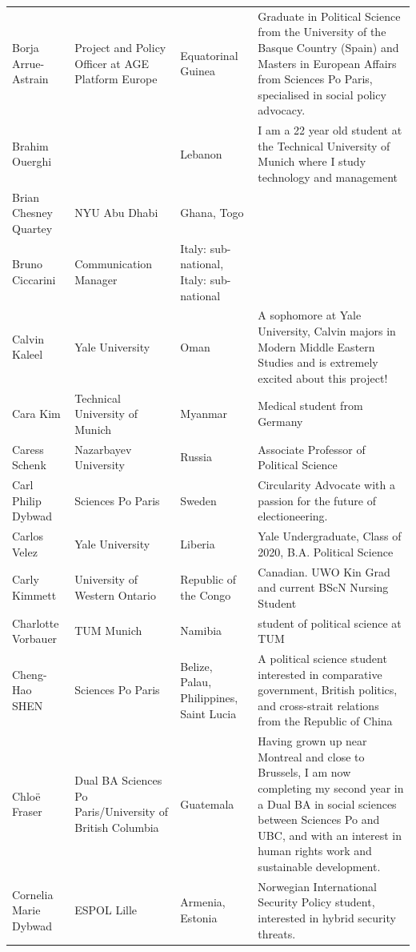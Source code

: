 \documentclass[]{article}
\begin{document}
\begin{longtable}{l>{\raggedright\arraybackslash}p{2cm}>{\raggedright\arraybackslash}p{2cm}>{\raggedright\arraybackslash}p{3cm}}
Borja Arrue-Astrain & Project and Policy Officer at AGE Platform Europe & Equatorinal Guinea & Graduate in Political Science from the University of the Basque Country (Spain) and Masters in European Affairs from Sciences Po Paris, specialised in social policy advocacy.\\
\rowcolor{gray!6}  Brahim Ouerghi &  & Lebanon & I am a 22 year old student at the Technical University of Munich where I study technology and management\\
Brian Chesney Quartey & NYU Abu Dhabi & Ghana, Togo & \\
\addlinespace
\rowcolor{gray!6}  Bruno Ciccarini & Communication Manager & Italy: sub-national, Italy: sub-national & \\
Calvin Kaleel & Yale University & Oman & A sophomore at Yale University, Calvin majors in Modern Middle Eastern Studies and is extremely excited about this project!\\
\rowcolor{gray!6}  Cara Kim & Technical University of Munich & Myanmar & Medical student from Germany\\
Caress Schenk & Nazarbayev University & Russia & Associate Professor of Political Science\\
\rowcolor{gray!6}  Carl Philip Dybwad & Sciences Po Paris & Sweden & Circularity Advocate with a passion for the future of electioneering.\\
\addlinespace
Carlos Velez & Yale University & Liberia & Yale Undergraduate, Class of 2020, B.A. Political Science\\
\rowcolor{gray!6}  Carly Kimmett & University of Western Ontario & Republic of the Congo & Canadian. UWO Kin Grad and current BScN Nursing Student\\
Charlotte Vorbauer & TUM Munich & Namibia & student of political science at TUM\\
\rowcolor{gray!6}  Cheng-Hao SHEN & Sciences Po Paris & Belize, Palau, Philippines, Saint Lucia & A political science student interested in comparative government, British politics, and cross-strait relations from the Republic of China\\
Chloë Fraser & Dual BA Sciences Po Paris/University of British Columbia & Guatemala & Having grown up near Montreal and close to Brussels, I am now completing my second year in a Dual BA in social sciences between Sciences Po and UBC, and with an interest in human rights work and sustainable development.\\
\addlinespace
\rowcolor{gray!6}  Cornelia Marie Dybwad & ESPOL Lille & Armenia, Estonia & Norwegian International Security Policy student, interested in hybrid security threats.\\

\end{longtable}
\end{document}

